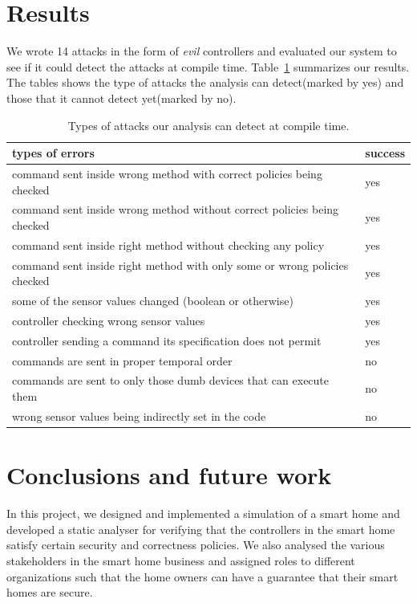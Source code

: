 \documentclass{article}
\begin{document}
\section{Results}
We wrote 14 attacks in the form of \textit{evil} controllers and evaluated our system to see if it could detect the attacks at compile time. Table~\ref{table:results} summarizes our results. The tables shows the type of attacks the analysis can detect(marked by yes) and those that it cannot detect yet(marked by no). 
\begin{table}[h]
\begin{center}
\begin{tabular}{|p{7cm}|p{1cm}|}
\hline
types of errors & success \\ \hline
command sent inside wrong method with correct policies being checked & yes \\ \hline
command sent inside wrong method without correct policies being checked & yes \\ \hline
command sent inside right method without checking any policy & yes \\ \hline
command sent inside right method with only some or wrong policies checked & yes \\ \hline
some of the sensor values changed (boolean or otherwise) & yes \\ \hline
controller checking wrong sensor values & yes \\ \hline
controller sending a command its specification does not permit & yes \\ \hline 
commands are sent in proper temporal order & no \\ \hline
commands are sent to only those dumb devices that can execute them & no \\\hline
wrong sensor values being indirectly set in the code & no \\\hline
\end{tabular}
\caption{\small{Types of attacks our analysis can detect at compile time.}}
\label{table:results}
\end{center}
\end{table}

\section{Conclusions and future work}
In this project, we designed and implemented a simulation of a smart home and developed a static analyser for verifying that the controllers in the smart home satisfy certain security and correctness policies. We also analysed the various stakeholders in the smart home business and assigned roles to different organizations such that the home owners can have a guarantee that their smart homes are secure. 
\end{document}
